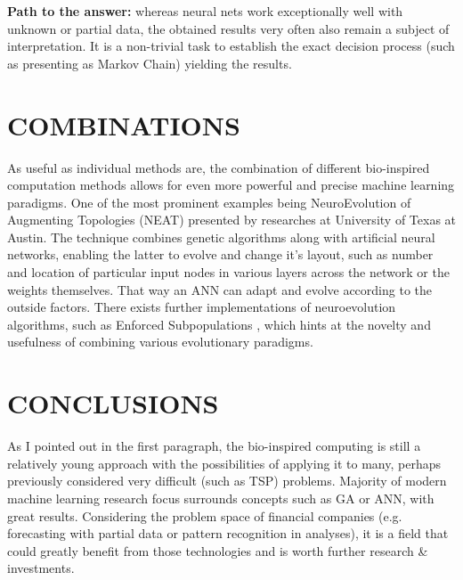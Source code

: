 \documentclass[letterpaper, 10 pt, conference]{ieeeconf}  %
\begin{document}
\textbf{Path to the answer:} whereas neural nets work exceptionally well with unknown or partial data, the obtained results very often also remain a subject of interpretation. It is a non-trivial task to establish the exact decision process (such as presenting as Markov Chain) yielding the results.

\section{COMBINATIONS}

As useful as individual methods are, the combination of different bio-inspired computation methods allows for even more powerful and precise machine learning paradigms. One of the most prominent examples being NeuroEvolution of Augmenting Topologies (NEAT) \cite{stanley2002evolving} presented by researches at University of Texas at Austin. The technique combines genetic algorithms along with artificial neural networks, enabling the latter to evolve and change it's layout, such as number and location of particular input nodes in various layers across the network or the weights themselves. That way an ANN can adapt and evolve according to the outside factors. There exists further implementations of neuroevolution algorithms, such as Enforced Subpopulations \cite{ha2015esp}, which hints at the novelty and usefulness of combining various evolutionary paradigms.

\section{CONCLUSIONS}

As I pointed out in the first paragraph, the bio-inspired computing is still a relatively young approach with the possibilities of applying it to many, perhaps previously considered very difficult (such as TSP) problems. Majority of modern machine learning research focus surrounds concepts such as GA or ANN, with great results. Considering the problem space of financial companies (e.g. forecasting with partial data or pattern recognition in analyses), it is a field that could greatly benefit from those technologies and is worth further research \& investments.

\addtolength{\textheight}{-12cm}   %










\end{document}
